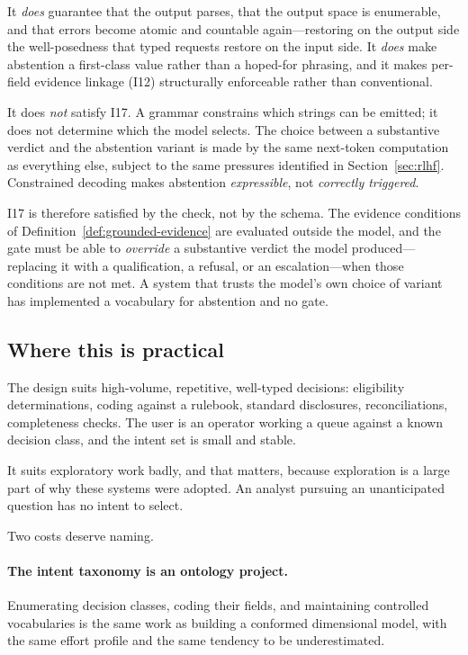 \documentclass[11pt]{article}
\theoremstyle{plain}
\theoremstyle{definition}
\begin{document}
It \emph{does} guarantee that the output parses, that the output space is enumerable,
and that errors become atomic and countable again---restoring on the output side the
well-posedness that typed requests restore on the input side. It \emph{does} make
abstention a first-class value rather than a hoped-for phrasing, and it makes
per-field evidence linkage (I12) structurally enforceable rather than conventional.

It does \emph{not} satisfy I17. A grammar constrains which strings can be emitted; it
does not determine which the model selects. The choice between a substantive verdict
and the abstention variant is made by the same next-token computation as everything
else, subject to the same pressures identified in Section~\ref{sec:rlhf}. Constrained decoding makes abstention \emph{expressible}, not
\emph{correctly triggered}.

I17 is therefore satisfied by the check, not by the schema. The evidence conditions of
Definition~\ref{def:grounded-evidence} are evaluated outside the model, and the gate
must be able to \emph{override} a substantive verdict the model produced---replacing it
with a qualification, a refusal, or an escalation---when those conditions are not met.
A system that trusts the model's own choice of variant has implemented a vocabulary
for abstention and no gate.

\subsection{Where this is practical}

The design suits high-volume, repetitive, well-typed decisions: eligibility
determinations, coding against a rulebook, standard disclosures, reconciliations,
completeness checks. The user is an operator working a queue against a known decision
class, and the intent set is small and stable.

It suits exploratory work badly, and that matters, because exploration is a large part
of why these systems were adopted. An analyst pursuing an unanticipated question has
no intent to select.

Two costs deserve naming.

\paragraph{The intent taxonomy is an ontology project.} Enumerating decision classes,
coding their fields, and maintaining controlled vocabularies is the same work as
building a conformed dimensional model, with the same effort profile and the same
tendency to be underestimated.
\end{document}
